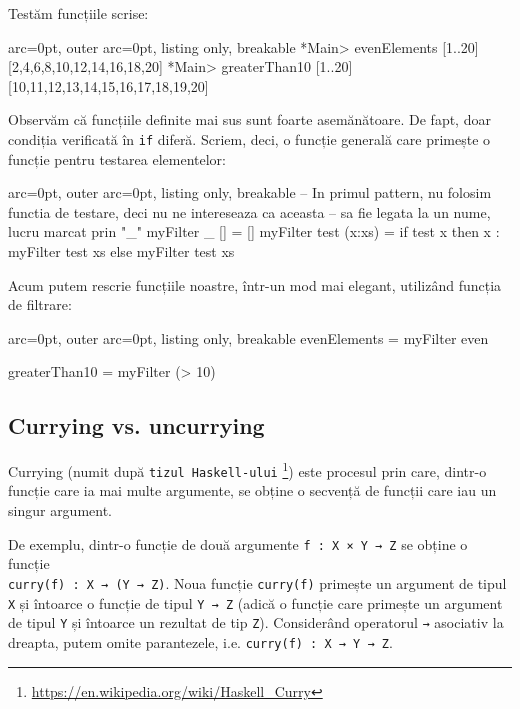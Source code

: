 Testăm funcțiile scrise:

\begin{tcblisting}{ arc=0pt, outer arc=0pt, listing only, breakable}
*Main> evenElements [1..20]
[2,4,6,8,10,12,14,16,18,20]
*Main> greaterThan10 [1..20]
[10,11,12,13,14,15,16,17,18,19,20]

\end{tcblisting}


Observăm că funcțiile definite mai sus sunt foarte asemănătoare. De fapt, doar condiția verificată în \texttt{if} diferă. Scriem, deci, o funcție generală care primește o funcție pentru testarea elementelor:


\begin{tcblisting}{ arc=0pt, outer arc=0pt, listing only, breakable}
-- In primul pattern, nu folosim functia de testare, deci nu ne intereseaza ca aceasta
-- sa fie legata la un nume, lucru marcat prin "_"
myFilter _ [] = []
myFilter test (x:xs) = if test x
                       then x : myFilter test xs
                       else myFilter test xs

\end{tcblisting}


Acum putem rescrie funcțiile noastre, într-un mod mai elegant, utilizând funcția de filtrare:


\begin{tcblisting}{ arc=0pt, outer arc=0pt, listing only, breakable}
evenElements = myFilter even

greaterThan10 = myFilter (> 10)

\end{tcblisting}



\subsection*{ Currying vs. uncurrying }

Currying (numit după \texttt{tizul Haskell-ului} \footnote{\url{https://en.wikipedia.org/wiki/Haskell\_Curry}}) este procesul prin care, dintr-o funcție care ia mai multe argumente, se obține o secvență de funcții care iau un singur argument.

De exemplu, dintr-o funcție de două argumente \texttt{f : X × Y → Z} se obține o funcție\\\texttt{curry(f) : X → (Y → Z)}. Noua funcție \texttt{curry(f)} primește un argument de tipul \texttt{X} și întoarce o funcție de tipul \texttt{Y → Z} (adică o funcție care primește un argument de tipul \texttt{Y} și întoarce un rezultat de tip \texttt{Z}). Considerând operatorul \texttt{→} asociativ la dreapta, putem omite parantezele, i.e. \texttt{curry(f) : X → Y → Z}.

